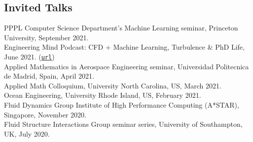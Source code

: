 \documentclass[line]{res}
\newenvironment{p}
  {\begin{adjustwidth}{-10pt}{0pt}}
  {\end{adjustwidth}}
\begin{document}
\begin{resume}
\section{Invited Talks}\vspace{0.5cm}
\begin{p}
PPPL Computer Science Department's Machine Learning seminar, Princeton University, September 2021.\\
Engineering Mind Podcast: CFD + Machine Learning, Turbulence \& PhD Life, June 2021. (\href{https://youtu.be/d1O3dFgvAP4}{\texttt{url}})\\
Applied Mathematics in Aerospace Engineering seminar, Universidad Politecnica de Madrid, Spain, April 2021.\\
Applied Math Colloquium, University North Carolina, US, March 2021.\\
Ocean Engineering, University Rhode Island, US, February 2021.\\
Fluid Dynamics Group Institute of High Performance Computing (A*STAR), Singapore, November 2020.\\
Fluid Structure Interactions Group seminar series, University of Southampton, UK, July 2020.
\end{p}


\end{resume}
\end{document}
